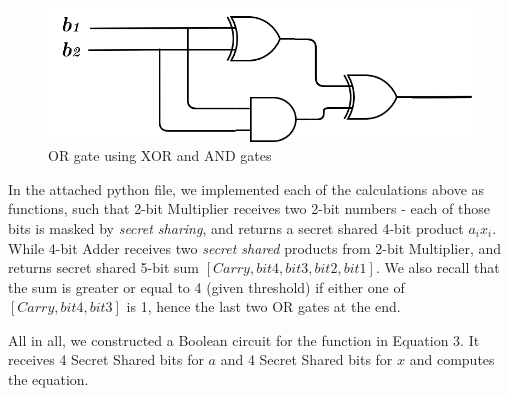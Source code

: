 \documentclass{article}
\begin{document}
\begin{figure}[H]
    \centering
    \includegraphics[width=1\linewidth]{OR GATE.png}
    \caption{OR gate using XOR and AND gates}
    \label{fig:enter-label}
\end{figure}

In the attached python file, we implemented each of the calculations above as functions, such that 2-bit Multiplier receives two 2-bit numbers - each of those bits is masked by \textit{secret sharing}, and returns a secret shared 4-bit product {$a_ix_i$.} While 4-bit Adder receives two \textit{secret shared} products from 2-bit Multiplier, and returns secret shared 5-bit sum $[Carry,bit4,bit3,bit2,bit1]$. We also recall that the sum is greater or equal to 4 (given threshold) if either one of $[Carry, bit4,bit3]$ is 1, hence the last two OR gates at the end. 


All in all, we constructed a Boolean circuit for the function in Equation 3. It receives 4 Secret Shared bits for $a$ and 4 Secret Shared bits for $x$ and computes the equation.
\end{document}
